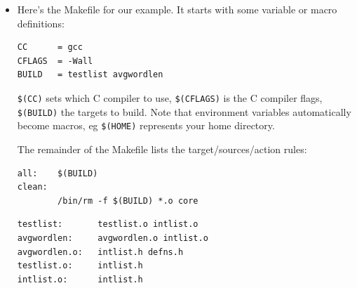 \documentclass[handout]{beamer}
\begin{document}
\begin{frame}[fragile]

\begin{itemize}
\item
    Here's the Makefile for our example.  It starts with some \alert{variable} or \alert{macro}
    definitions:
\small
\begin{verbatim}
CC      = gcc
CFLAGS  = -Wall
BUILD   = testlist avgwordlen
\end{verbatim}

\verb+$(CC)+ sets which C compiler to use,
\verb+$(CFLAGS)+ is the C compiler flags, \verb+$(BUILD)+ the targets to build.
Note that environment variables automatically become macros, eg \verb+$(HOME)+
represents your home directory.

\pitem
The remainder of the Makefile lists the target/sources/action rules:

\begin{verbatim}
all:    $(BUILD)
clean:
        /bin/rm -f $(BUILD) *.o core
\end{verbatim}

\pause
\begin{verbatim}
testlist:       testlist.o intlist.o
avgwordlen:     avgwordlen.o intlist.o
avgwordlen.o:   intlist.h defns.h
testlist.o:     intlist.h
intlist.o:      intlist.h
\end{verbatim}

\end{itemize}

\end{frame}
\end{document}
